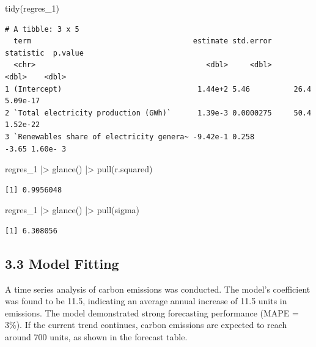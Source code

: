 \documentclass[
  letterpaper,
  DIV=11,
  numbers=noendperiod]{scrartcl}
\newenvironment{Shaded}{\begin{snugshade}}{\end{snugshade}}
\newcommand{\FunctionTok}[1]{\textcolor[rgb]{0.28,0.35,0.67}{#1}}
\newcommand{\NormalTok}[1]{\textcolor[rgb]{0.00,0.23,0.31}{#1}}
\newcommand{\SpecialCharTok}[1]{\textcolor[rgb]{0.37,0.37,0.37}{#1}}
\begin{document}
\begin{Shaded}
\begin{Highlighting}[]
\FunctionTok{tidy}\NormalTok{(regres\_1)}
\end{Highlighting}
\end{Shaded}

\begin{verbatim}
# A tibble: 3 x 5
  term                                     estimate std.error statistic  p.value
  <chr>                                       <dbl>     <dbl>     <dbl>    <dbl>
1 (Intercept)                               1.44e+2 5.46          26.4  5.09e-17
2 `Total electricity production (GWh)`      1.39e-3 0.0000275     50.4  1.52e-22
3 `Renewables share of electricity genera~ -9.42e-1 0.258         -3.65 1.60e- 3
\end{verbatim}

\begin{Shaded}
\begin{Highlighting}[]
\NormalTok{regres\_1 }\SpecialCharTok{|\textgreater{}} \FunctionTok{glance}\NormalTok{() }\SpecialCharTok{|\textgreater{}} \FunctionTok{pull}\NormalTok{(r.squared)}
\end{Highlighting}
\end{Shaded}

\begin{verbatim}
[1] 0.9956048
\end{verbatim}

\begin{Shaded}
\begin{Highlighting}[]
\NormalTok{regres\_1 }\SpecialCharTok{|\textgreater{}} \FunctionTok{glance}\NormalTok{() }\SpecialCharTok{|\textgreater{}} \FunctionTok{pull}\NormalTok{(sigma)}
\end{Highlighting}
\end{Shaded}

\begin{verbatim}
[1] 6.308056
\end{verbatim}

\subsection{3.3 Model Fitting}\label{model-fitting}

A time series analysis of carbon emissions was conducted. The model's
coefficient was found to be 11.5, indicating an average annual increase
of 11.5 units in emissions. The model demonstrated strong forecasting
performance (MAPE = 3\%). If the current trend continues, carbon
emissions are expected to reach around 700 units, as shown in the
forecast table.
\end{document}
